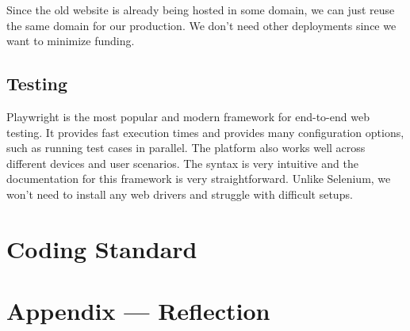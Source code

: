 \documentclass{article}
\begin{document}
\noindent Since the old website is already being hosted in some domain, we can just reuse the same domain for our production. We don't need other deployments since we want to minimize funding.

\subsection*{Testing}

Playwright is the most popular and modern framework for end-to-end web testing. It provides fast execution times and provides many configuration options, such as running test cases in parallel. The platform also works well across different devices and user scenarios. The syntax is very intuitive and the documentation for this framework is very straightforward. Unlike Selenium, we won't need to install any web drivers and struggle with difficult setups.

\section{Coding Standard}


\newpage{}

\section*{Appendix --- Reflection}
\end{document}

